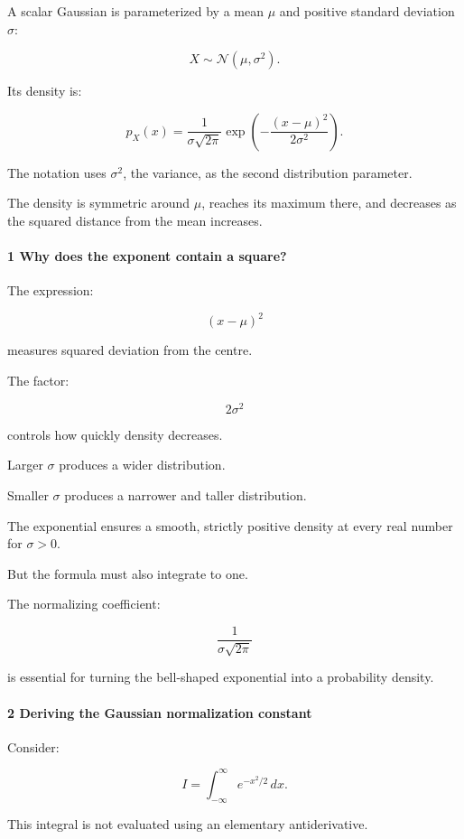A scalar Gaussian is parameterized by a mean \(\mu\) and positive standard deviation \(\sigma\):

\[
 \boxed{ X\sim\mathcal N(\mu,\sigma^2) }.
\]

Its density is:

\[
 \boxed{ p_X(x)= \frac1{\sigma\sqrt{2\pi}} \exp\left( -\frac{(x-\mu)^2}{2\sigma^2} \right) }.
\]

The notation uses \(\sigma^2\), the variance, as the second distribution parameter.

The density is symmetric around \(\mu\), reaches its maximum there, and decreases as the squared distance from the mean increases.

\paragraph{1 Why does the exponent contain a square?}\label{why-does-the-exponent-contain-a-square}

The expression:

\[
 (x-\mu)^2
\]

measures squared deviation from the centre.

The factor:

\[
 2\sigma^2
\]

controls how quickly density decreases.

Larger \(\sigma\) produces a wider distribution.

Smaller \(\sigma\) produces a narrower and taller distribution.

The exponential ensures a smooth, strictly positive density at every real number for \(\sigma>0\).

But the formula must also integrate to one.

The normalizing coefficient:

\[
 \frac1{\sigma\sqrt{2\pi}}
\]

is essential for turning the bell-shaped exponential into a probability density.

\paragraph{2 Deriving the Gaussian normalization constant}\label{deriving-the-gaussian-normalization-constant}

Consider:

\[
 I=\int_{-\infty}^{\infty}e^{-x^2/2}\,dx.
\]

This integral is not evaluated using an elementary antiderivative.

